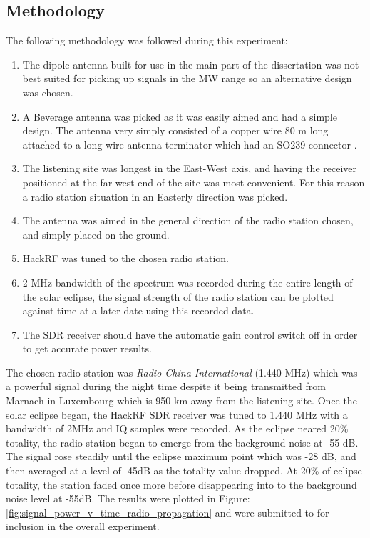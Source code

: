 \documentclass[runningheads,a4paper]{llncs}
\begin{document}
\subsection*{Methodology}
The following methodology was followed during this experiment:

\begin{enumerate}
	\item The dipole antenna built for use in the main part of the dissertation was not best suited for picking up signals in the \gls{MW} range so an alternative design was chosen. 
	\item A Beverage antenna was picked as it was easily aimed and had a simple design. The antenna very simply consisted of a copper wire 80 m long attached to a long wire antenna terminator which had an SO239 connector \citep{litva-76}.
	\item The listening site was longest in the East-West axis, and having the receiver positioned at the far west end of the site was most convenient. For this reason a radio station situation in an Easterly direction was picked.
	\item The antenna was aimed in the general direction of the radio station chosen, and simply placed on the ground.
	\item HackRF was tuned to the chosen radio station.
	\item 2 MHz bandwidth of the spectrum was recorded during the entire length of the solar eclipse, the signal strength of the radio station can be plotted against time at a later date using this recorded data.
	\item The \gls{SDR} receiver should have the automatic gain control switch off in order to get accurate power results. 
\end{enumerate}


The chosen radio station was \textit{Radio China International} (1.440 MHz) which was a powerful signal during the night time despite it being transmitted from Marnach in Luxembourg which is 950 km away from the listening site. Once the solar eclipse began, the HackRF \gls{SDR} receiver was tuned to 1.440 MHz with a bandwidth of 2MHz and \gls{IQ} samples were recorded. As the eclipse neared 20\% totality, the radio station began to emerge from the background noise at -55 dB. The signal rose steadily until the eclipse maximum point which was -28 dB, and then averaged at a level of -45dB as the totality value dropped. At 20\% of eclipse totality, the station faded once more before disappearing into to the background noise level at -55dB. The results were plotted in Figure: \ref{fig:signal_power_v_time_radio_propagation} and were submitted to \citet{RSGB-15-b} for inclusion in the overall experiment.
\end{document}
